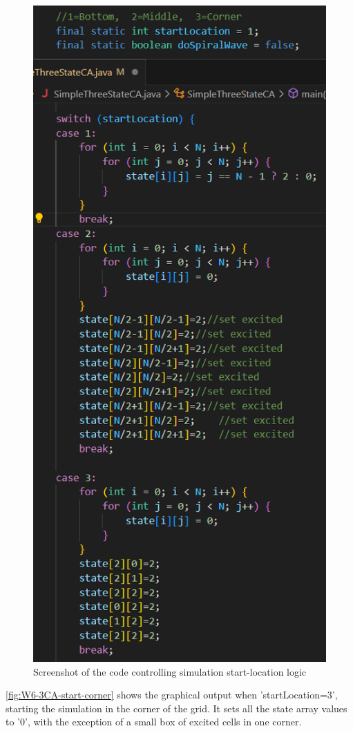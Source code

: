 \begin{figure}[H] 
    \centering
    \includegraphics[width=0.6\columnwidth]{Figures/Week 6/3stateCA-plane-logic-code.png}
    \caption{Screenshot of the code controlling simulation start-location logic}
    \label{fig:W6-3CA-conditional-logic-code}
\end{figure}

\newpage

\autoref{fig:W6-3CA-start-corner} shows the graphical output when 'startLocation=3', starting the simulation in the corner of the grid. It sets all the state array values to '0', with the exception of a small box of excited cells in one corner.

